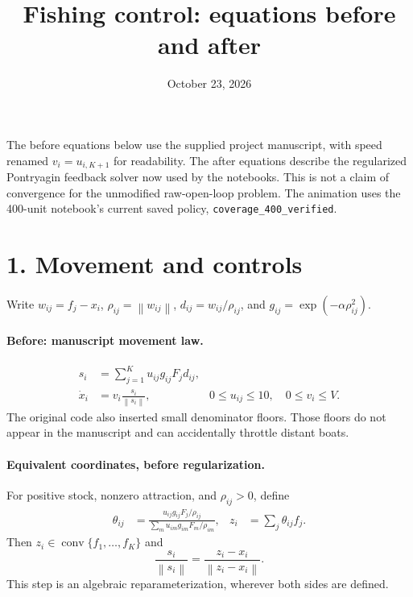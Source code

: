 \documentclass[11pt]{article}
\title{Fishing control: equations before and after}
\author{}
\date{October 23, 2026}
\newcommand{\norm}[1]{\left\lVert #1\right\rVert}
\begin{document}
\maketitle
\noindent
The before equations below use the supplied project manuscript, with speed
renamed \(v_i=u_{i,K+1}\) for readability. The after equations describe the
regularized Pontryagin feedback solver now used by the notebooks.
This is not a claim of convergence for the unmodified raw-open-loop problem.
The animation uses the 400-unit notebook's current saved policy,
\texttt{coverage\_400\_verified}.

\section*{1. Movement and controls}
Write \(w_{ij}=f_j-x_i\), \(\rho_{ij}=\norm{w_{ij}}\),
\(d_{ij}=w_{ij}/\rho_{ij}\), and
\(g_{ij}=\exp(-\alpha\rho_{ij}^2)\).

\paragraph{Before: manuscript movement law.}
\begin{align}
s_i&=\sum_{j=1}^{K}u_{ij}g_{ij}F_jd_{ij},\\
\dot x_i&=v_i\frac{s_i}{\norm{s_i}},
&0\leq u_{ij}\leq10,\quad 0\leq v_i\leq V .
\end{align}
The original code also inserted small denominator floors. Those floors do
not appear in the manuscript and can accidentally throttle distant boats.

\paragraph{Equivalent coordinates, before regularization.}
For positive stock, nonzero attraction, and \(\rho_{ij}>0\), define
\begin{align}
\theta_{ij}
&=\frac{u_{ij}g_{ij}F_j/\rho_{ij}}
        {\sum_m u_{im}g_{im}F_m/\rho_{im}},&
z_i&=\sum_j\theta_{ij}f_j .
\end{align}
Then \(z_i\in\operatorname{conv}\{f_1,\ldots,f_K\}\) and
\[
\frac{s_i}{\norm{s_i}}
=\frac{z_i-x_i}{\norm{z_i-x_i}}.
\]
This step is an algebraic reparameterization, wherever both sides are defined.
\end{document}
